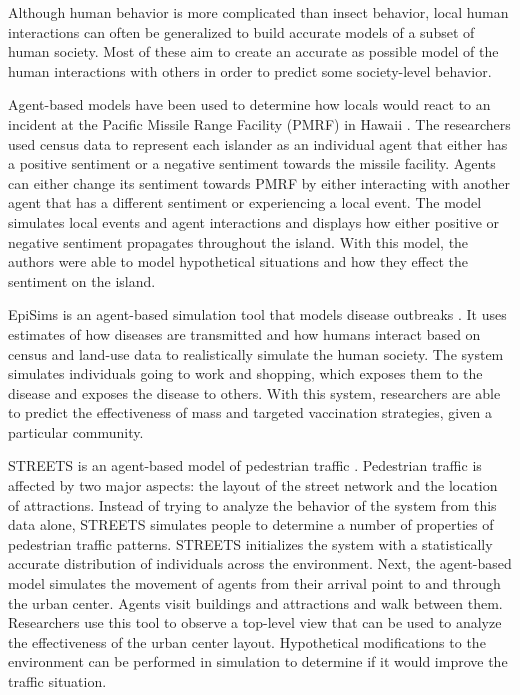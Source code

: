 Although human behavior is more complicated than insect behavior, local human interactions can often be generalized to build accurate models of a subset of human society.
Most of these aim to create an accurate as possible model of the human interactions with others in order to predict some society-level behavior.

Agent-based models have been used to determine how locals would react to an incident at the Pacific Missile Range Facility (PMRF) in Hawaii \cite{zanbaka}.
The researchers used census data to represent each islander as an individual agent that either has a positive sentiment or a negative sentiment towards the missile facility.
Agents can either change its sentiment towards PMRF by either interacting with another agent that has a different sentiment or experiencing a local event.
The model simulates local events and agent interactions and displays how either positive or negative sentiment propagates throughout the island.
With this model, the authors were able to model hypothetical situations and how they effect the sentiment on the island.

EpiSims is an agent-based simulation tool that models disease outbreaks \cite{eubank2004modelling}.
It uses estimates of how diseases are transmitted and how humans interact based on census and land-use data to realistically simulate the human society.
The system simulates individuals going to work and shopping, which exposes them to the disease and exposes the disease to others.
With this system, researchers are able to predict the effectiveness of mass and targeted vaccination strategies, given a particular community.

STREETS is an agent-based model of pedestrian traffic \cite{schelhorn1999streets}.
Pedestrian traffic is affected by two major aspects: the layout of the street network and the location of attractions.
Instead of trying to analyze the behavior of the system from this data alone, STREETS simulates people to determine a number of properties of pedestrian traffic patterns.
STREETS initializes the system with a statistically accurate distribution of individuals across the environment.
Next, the agent-based model simulates the movement of agents from their arrival point to and through the urban center.
Agents visit buildings and attractions and walk between them.
Researchers use this tool to observe a top-level view that can be used to analyze the effectiveness of the urban center layout.
Hypothetical modifications to the environment can be performed in simulation to determine if it would improve the traffic situation.

